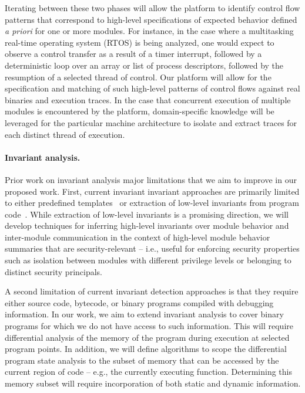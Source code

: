 \documentclass[letterpaper,twoside,11pt,headings=small]{scrartcl}
\begin{document}
Iterating between these two phases will allow the platform to identify control
flow patterns that correspond to high-level specifications of expected
behavior defined \emph{a priori} for one or more modules.  For instance, in
the case where a multitasking real-time operating system (RTOS) is being
analyzed, one would expect to observe a control transfer as a result of a
timer interrupt, followed by a deterministic loop over an array or list of
process descriptors, followed by the resumption of a selected thread of
control.  Our platform will allow for the specification and matching of such
high-level patterns of control flows against real binaries and execution
traces.  In the case that concurrent execution of multiple modules is
encountered by the platform, domain-specific knowledge will be leveraged for
the particular machine architecture to isolate and extract traces for each
distinct thread of execution.

\paragraph{Invariant analysis.} Prior work on invariant analysis major
limitations that we aim to improve in our proposed work.  First, current
invariant invariant approaches are primarily limited to either predefined
templates~\cite{ernst:2009:daikon} or extraction of low-level invariants from
program code~\cite{csallner:icse2008:dysy}.  While extraction of low-level
invariants is a promising direction, we will develop techniques for inferring
high-level invariants over module behavior and inter-module communication in
the context of high-level module behavior summaries that are security-relevant
-- i.e., useful for enforcing security properties such as isolation between
   modules with different privilege levels or belonging to distinct security
   principals.

A second limitation of current invariant detection approaches is that they
require either source code, bytecode, or binary programs compiled with
debugging information.  In our work, we aim to extend invariant analysis to
cover binary programs for which we do not have access to such information.
This will require differential analysis of the memory of the program during
execution at selected program points.  In addition, we will define algorithms
to scope the differential program state analysis to the subset of memory that
can be accessed by the current region of code -- e.g., the currently executing
function.  Determining this memory subset will require incorporation of both
static and dynamic information.
\end{document}
